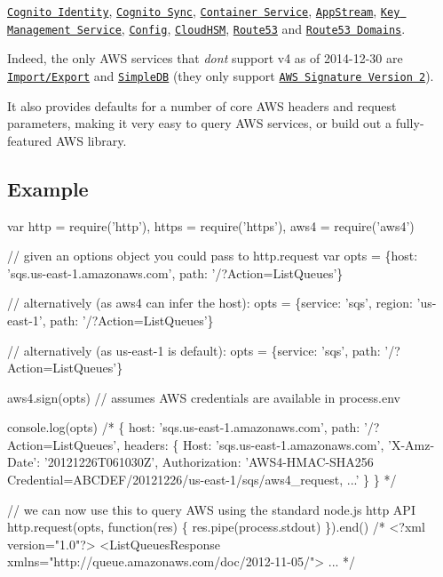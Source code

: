 \href{http://docs.aws.amazon.com/cognitoidentity/latest/APIReference/}{\tt Cognito Identity}, \href{http://docs.aws.amazon.com/cognitosync/latest/APIReference/}{\tt Cognito Sync}, \href{http://docs.aws.amazon.com/AmazonECS/latest/APIReference/}{\tt Container Service}, \href{http://docs.aws.amazon.com/appstream/latest/developerguide/appstream-api-rest.html}{\tt App\+Stream}, \href{http://docs.aws.amazon.com/kms/latest/APIReference/}{\tt Key Management Service}, \href{http://docs.aws.amazon.com/config/latest/APIReference/}{\tt Config}, \href{http://docs.aws.amazon.com/cloudhsm/latest/dg/api-ref.html}{\tt Cloud\+H\+SM}, \href{http://docs.aws.amazon.com/Route53/latest/APIReference/requests-rest.html}{\tt Route53} and \href{http://docs.aws.amazon.com/Route53/latest/APIReference/requests-rpc.html}{\tt Route53 Domains}.

Indeed, the only A\+WS services that {\itshape don\textquotesingle{}t} support v4 as of 2014-\/12-\/30 are \href{http://docs.aws.amazon.com/AWSImportExport/latest/DG/api-reference.html}{\tt Import/\+Export} and \href{http://docs.aws.amazon.com/AmazonSimpleDB/latest/DeveloperGuide/SDB_API.html}{\tt Simple\+DB} (they only support \href{https://github.com/mhart/aws2}{\tt A\+WS Signature Version 2}).

It also provides defaults for a number of core A\+WS headers and request parameters, making it very easy to query A\+WS services, or build out a fully-\/featured A\+WS library.

\subsection*{Example }


\begin{DoxyCode}
var http  = require('http'),
    https = require('https'),
    aws4  = require('aws4')

// given an options object you could pass to http.request
var opts = \{host: 'sqs.us-east-1.amazonaws.com', path: '/?Action=ListQueues'\}

// alternatively (as aws4 can infer the host):
opts = \{service: 'sqs', region: 'us-east-1', path: '/?Action=ListQueues'\}

// alternatively (as us-east-1 is default):
opts = \{service: 'sqs', path: '/?Action=ListQueues'\}

aws4.sign(opts) // assumes AWS credentials are available in process.env

console.log(opts)
/*
\{
  host: 'sqs.us-east-1.amazonaws.com',
  path: '/?Action=ListQueues',
  headers: \{
    Host: 'sqs.us-east-1.amazonaws.com',
    'X-Amz-Date': '20121226T061030Z',
    Authorization: 'AWS4-HMAC-SHA256 Credential=ABCDEF/20121226/us-east-1/sqs/aws4\_request, ...'
  \}
\}
*/

// we can now use this to query AWS using the standard node.js http API
http.request(opts, function(res) \{ res.pipe(process.stdout) \}).end()
/*
<?xml version="1.0"?>
<ListQueuesResponse xmlns="http://queue.amazonaws.com/doc/2012-11-05/">
...
*/
\end{DoxyCode}


